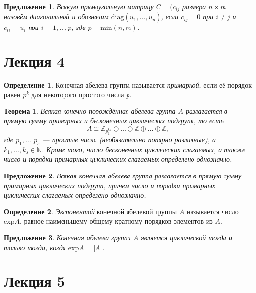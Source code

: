 \documentclass[a4paper]{article}
\theoremstyle{plain}
\newtheorem*{theorem}{Теорема}
\newtheorem{proposal}{Предложение}
\theoremstyle{definition}
\newtheorem{definition}{Определение}
\numberwithin{definition}{section}
\numberwithin{proposal}{section}
\begin{document}
\begin{proposal}
Всякую прямоугольную матрицу \(C = (c_{ij}\) размера \(n \times m\) назовём диагональной и обозначим \(\textrm{diag}(u_1, \dots, u_p)\), если \(c_{ij} = 0\) при \(i \neq j\) и \(c_{ii} = u_i\) при \(i = 1, \dots, p\), где \(p = \textrm{min}(n, m)\). 
\end{proposal}


\section{Лекция 4}

\begin{definition}
Конечная абелева группа называется \emph{примарной}, если её порядок равен \(p^k\) для некоторого простого числа \(p\).
\end{definition}

\begin{theorem}
Всякая конечно порождённая абелева группа \(A\) разлагается в прямую сумму примарных и бесконечных циклических подгрупп, то есть
\begin{equation*}
	A \cong \mathbb{Z}_{p_1^{k_1}} \oplus \dots \oplus \mathbb{Z} \oplus \dots \oplus \mathbb{Z},
\end{equation*}
где \(p_1, \dots, p_s\) --- простые числа (необязательно попарно различные), а \(k_1, \dots, k_s \in \mathbb{N}\). Кроме того, число бесконечных циклических слагаемых, а также число и порядки примарных циклических слагаемых определено однозначно. 
\end{theorem}

\begin{proposal}
Всякая конечная абелева группа разлагается в прямую сумму примарных циклических подгрупп, причем число и порядки примарных циклических слагаемых определено однозначно.
\end{proposal}

\begin{definition}
\emph{Экспонентой} конечной абелевой группы \(A\) называется число \(\mathrm{exp} A\), равное наименьшему общему кратному порядков элементов из \(A\).
\end{definition}

\begin{proposal}
Конечная абелева группа \(A\) является циклической тогда и только тогда, когда \(\mathrm{exp} A = |A|\).
\end{proposal}


\section{Лекция 5}
\end{document}

